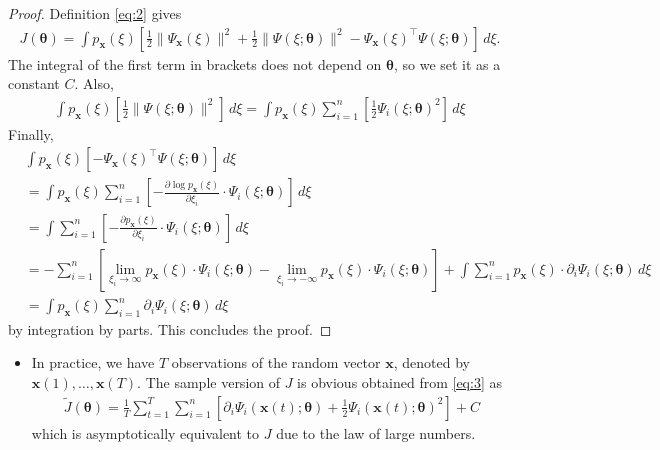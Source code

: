 \documentclass[10pt]{article}
\begin{document}
\begin{proof}
Definition \eqref{eq:2} gives
\begin{align*}
J(\bm{\theta}) = \int p_\mathbf{x}(\xi) \left[ \frac{1}{2} \|\Psi_\mathbf{x}(\xi)\|^2 + \frac{1}{2} \|\Psi(\xi;\bm{\theta})\|^2 - \Psi_\mathbf{x}(\xi)^\top \Psi(\xi;\bm{\theta}) \right] \, d\xi.
\end{align*}
The integral of the first term in brackets does not depend on $\bm{\theta}$, so we set it as a constant $C$. Also,
\begin{align*}
\int p_\mathbf{x}(\xi) \left[ \frac{1}{2} \| \Psi(\xi;\bm{\theta}) \|^2 \right] \, d\xi = \int p_\mathbf{x}(\xi) \sum_{i = 1}^n \left[ \frac{1}{2} \Psi_i(\xi;\bm{\theta})^2 \right] \, d\xi
\end{align*}
Finally,
\begin{align*}
&\int p_\mathbf{x}(\xi) \left[ - \Psi_\mathbf{x}(\xi)^\top \Psi(\xi;\bm{\theta}) \right] \, d\xi \\
&= \int p_\mathbf{x}(\xi) \sum_{i = 1}^n \left[ -\frac{\partial \log p_\mathbf{x}(\xi)}{\partial \xi_i} \cdot \Psi_i(\xi;\bm{\theta}) \right] \, d\xi \\
&= \int \sum_{i = 1}^n \left[ -\frac{\partial p_\mathbf{x}(\xi)}{\partial \xi_i} \cdot \Psi_i(\xi;\bm{\theta}) \right] \, d\xi \\
&= -\sum_{i = 1}^n \left[ \lim_{\xi_i \rightarrow \infty} p_\mathbf{x}(\xi) \cdot \Psi_i(\xi;\bm{\theta}) - \lim_{\xi_i \rightarrow -\infty} p_\mathbf{x}(\xi) \cdot \Psi_i(\xi;\bm{\theta}) \right] + \int \sum_{i = 1}^n p_\mathbf{x}(\xi) \cdot \partial_i \Psi_i(\xi;\bm{\theta}) \, d\xi \\
&= \int p_\mathbf{x}(\xi) \sum_{i = 1}^n \partial_i \Psi_i(\xi;\bm{\theta}) \, d\xi
\end{align*}
by integration by parts. This concludes the proof.
\end{proof}

\newpage

\begin{itemize}
\item In practice, we have $T$ observations of the random vector $\mathbf{x}$, denoted by $\mathbf{x}(1), \ldots, \mathbf{x}(T)$. The sample version of $J$ is obvious obtained from \eqref{eq:3} as
\begin{align}
\tilde{J}(\bm{\theta}) = \frac{1}{T} \sum_{t = 1}^T \sum_{i = 1}^n \left[ \partial_i \Psi_i(\mathbf{x}(t);\bm{\theta}) + \frac{1}{2} \Psi_i(\mathbf{x}(t);\bm{\theta})^2 \right] + C \label{eq:4}
\end{align}
which is asymptotically equivalent to $J$ due to the law of large numbers.
\end{itemize}
\end{document}
